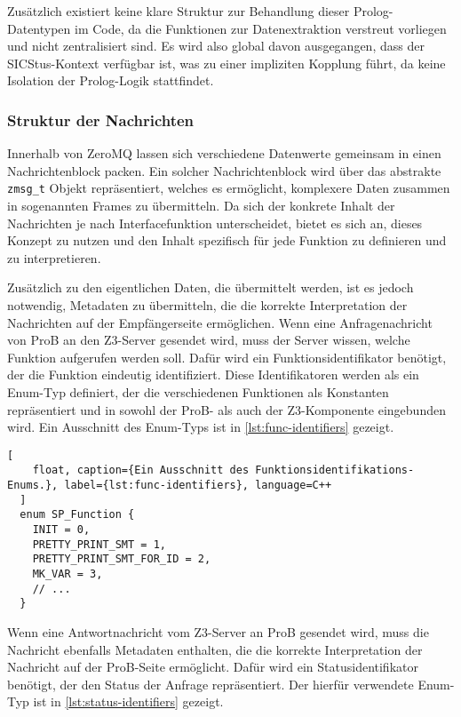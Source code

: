 Zusätzlich existiert keine klare Struktur zur Behandlung dieser Prolog-Datentypen im Code,
da die Funktionen zur Datenextraktion verstreut vorliegen und nicht zentralisiert sind.
Es wird also global davon ausgegangen, dass der SICStus-Kontext verfügbar ist, was zu einer impliziten Kopplung führt, da keine Isolation der Prolog-Logik stattfindet.

\subsubsection{Struktur der Nachrichten}
Innerhalb von ZeroMQ lassen sich verschiedene Datenwerte gemeinsam in einen Nachrichtenblock packen.
Ein solcher Nachrichtenblock wird über das abstrakte \texttt{zmsg\_t} Objekt repräsentiert, welches es ermöglicht,
komplexere Daten zusammen in sogenannten Frames zu übermitteln.
Da sich der konkrete Inhalt der Nachrichten je nach Interfacefunktion unterscheidet,
bietet es sich an, dieses Konzept zu nutzen und den Inhalt spezifisch für jede Funktion zu definieren und zu interpretieren.

Zusätzlich zu den eigentlichen Daten, die übermittelt werden, ist es jedoch notwendig, Metadaten zu übermitteln,
die die korrekte Interpretation der Nachrichten auf der Empfängerseite ermöglichen.
Wenn eine Anfragenachricht von ProB an den Z3-Server gesendet wird, muss der Server wissen, welche Funktion aufgerufen werden soll.
Dafür wird ein Funktionsidentifikator benötigt, der die Funktion eindeutig identifiziert.
Diese Identifikatoren werden als ein Enum-Typ definiert, der die verschiedenen Funktionen als Konstanten repräsentiert und in sowohl
der ProB- als auch der Z3-Komponente eingebunden wird.
Ein Ausschnitt des Enum-Typs ist in \cref{lst:func-identifiers} gezeigt.

\begin{lstlisting}[
    float, caption={Ein Ausschnitt des Funktionsidentifikations-Enums.}, label={lst:func-identifiers}, language=C++
  ]
  enum SP_Function {
    INIT = 0,
    PRETTY_PRINT_SMT = 1,
    PRETTY_PRINT_SMT_FOR_ID = 2,
    MK_VAR = 3,
    // ...
  }
\end{lstlisting}

Wenn eine Antwortnachricht vom Z3-Server an ProB gesendet wird, muss die Nachricht ebenfalls Metadaten enthalten,
die die korrekte Interpretation der Nachricht auf der ProB-Seite ermöglicht.
Dafür wird ein Statusidentifikator benötigt, der den Status der Anfrage repräsentiert.
Der hierfür verwendete Enum-Typ ist in \cref{lst:status-identifiers} gezeigt.

